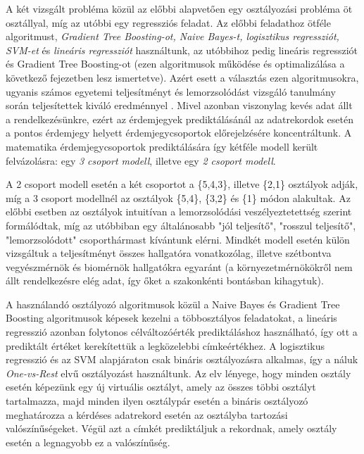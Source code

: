 \documentclass[12pt]{article}
\begin{document}
A két vizsgált probléma közül az előbbi alapvetően egy osztályozási probléma öt osztállyal, míg az utóbbi egy regressziós feladat. Az előbbi feladathoz ötféle algoritmust, \textit{Gradient Tree Boosting-ot, Naive Bayes-t, logisztikus regressziót, SVM-et} és \textit{lineáris regressziót} használtunk, az utóbbihoz pedig lineáris regressziót és Gradient Tree Boosting-ot (ezen algoritmusok működése és optimalizálása a következő fejezetben lesz ismertetve). Azért esett a választás ezen algoritmusokra, ugyanis számos egyetemi teljesítményt és lemorzsolódást vizsgáló tanulmány során teljesítettek kiváló eredménnyel \cite{modeling1, modeling2, modeling3, modeling4}. Mivel azonban viszonylag kevés adat állt a rendelkezésünkre, ezért az érdemjegyek prediktálásánál az adatrekordok esetén a pontos érdemjegy helyett érdemjegycsoportok előrejelzésére koncentráltunk. A matematika érdemjegycsoportok prediktálására így kétféle modell került felvázolásra: egy \textit{3 csoport modell}, illetve egy \textit{2 csoport modell}.

A 2 csoport modell esetén a két csoportot a \{5,4,3\}, illetve \{2,1\} osztályok adják, míg a 3 csoport modellnél az osztályok \{5,4\}, \{3,2\} és \{1\} módon alakultak. Az előbbi esetben az osztályok intuitívan a lemorzsolódási veszélyeztetettség szerint formálódtak, míg az utóbbiban egy általánosabb "jól teljesítő", "rosszul teljesítő", "lemorzsolódott" csoporthármast kívántunk elérni. Mindkét modell esetén külön vizsgáltuk a teljesítményt összes hallgatóra vonatkozólag, illetve szétbontva vegyészmérnök és biomérnök hallgatókra egyaránt (a környezetmérnökökről nem állt rendelkezésre elég adat, így őket a szakonkénti bontásban kihagytuk).

A használandó osztályozó algoritmusok közül a Naive Bayes és Gradient Tree Boosting algoritmusok képesek kezelni a többosztályos feladatokat, a lineáris regresszió azonban folytonos célváltozóérték prediktáláshoz használható, így ott a prediktált értéket kerekítettük a legközelebbi címkeértékhez. A logisztikus regresszió és az SVM alapjáraton csak bináris osztályozásra alkalmas, így a náluk \textit{One-vs-Rest} elvű osztályozást használtunk. Az elv lényege, hogy minden osztály esetén képezünk egy új virtuális osztályt, amely az összes többi osztályt tartalmazza, majd minden ilyen osztálypár esetén a bináris osztályozó meghatározza a kérdéses adatrekord esetén az osztályba tartozási valószínűségeket. Végül azt a címkét prediktáljuk a rekordnak, amely osztály esetén a legnagyobb ez a valószínűség. 
\end{document}

